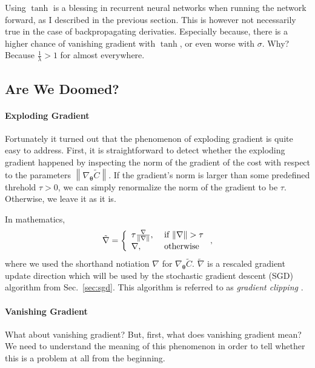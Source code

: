 \documentclass{report}
\newcommand{\vects}[1]{\boldsymbol{#1}}
\newcommand{\TT}[0]{\vects{\theta}}
\newcommand{\sigmoid}{\sigma}
\begin{document}
Using $\tanh$ is a blessing in recurrent neural networks when running the
network forward, as I described in the previous section. This is however not
necessarily true in the case of backpropagating derivaties. Especially because, 
there is a higher chance of vanishing gradient with $\tanh$, or even worse with
$\sigmoid$. Why? Because $\frac{1}{\lambda} > 1$ for almost everywhere.

\subsection{Are We Doomed?}
\label{sec:rnn_vanish_grad}

\paragraph{Exploding Gradient}

Fortunately it turned out that the phenomenon of exploding gradient is quite
easy to address. First, it is straightforward to detect whether the exploding
gradient happened by inspecting the norm of the gradient of the cost with
respect to the parameters $\left\| \nabla_{\TT} \tilde{C} \right\|$. If the
gradient's norm is larger than some predefined threhold $\tau > 0$, we can
simply renormalize the norm of the gradient to be $\tau$. Otherwise, we leave it
as it is.

In mathematics,
\begin{align*}
    \tilde{\nabla} = 
    \left\{
        \begin{array}{l l}
            \tau \frac{\nabla}{\|\nabla\|}, & \text{ if } \|\nabla\| > \tau \\
            \nabla, & \text{ otherwise}
        \end{array}
    \right.,
\end{align*}
where we used the shorthand notiation $\nabla$ for $\nabla_{\TT} \tilde{C}$.
$\tilde{\nabla}$ is a rescaled gradient update direction which will be used by
the stochastic gradient descent (SGD) algorithm from Sec.~\ref{sec:sgd}. This
algorithm is referred to as {\em gradient clipping}
\cite{pascanu2013difficulty}.

\paragraph{Vanishing Gradient}

What about vanishing gradient? But, first, what does vanishing gradient mean? We
need to understand the meaning of this phenomenon in order to tell whether this
is a problem at all from the beginning.
\end{document}

